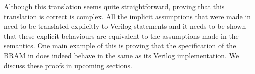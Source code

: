 Although this translation seems quite straight\-forward, proving that this
translation is correct is complex.  All the implicit assumptions that were made
in \htl{} need to be translated explicitly to Verilog statements and it needs to
be shown that these explicit behaviours are equivalent to the assumptions made
in the \htl{} semantics.  One main example of this is proving that the
specification of the \gls{BRAM} in \htl{} does indeed behave in the same as its
Verilog implementation.  We discuss these proofs in upcoming sections.



